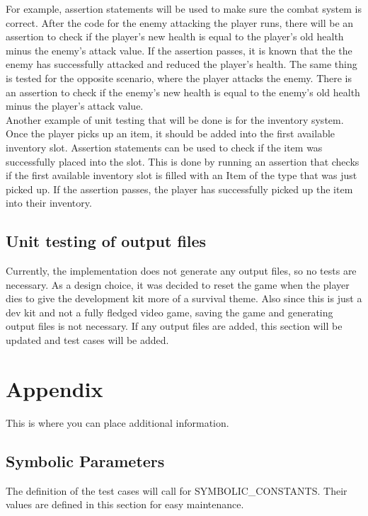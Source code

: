 \documentclass[12pt, titlepage]{article}
\begin{document}
For example, assertion statements will be used to make sure the combat system is correct. After the code for the enemy attacking the player runs, there will be an assertion to check if the player's new health is equal to the player's old health minus the enemy's attack value. If the assertion passes, it is known that the the enemy has successfully attacked and reduced the player's health. The same thing is tested for the opposite scenario, where the player attacks the enemy. There is an assertion to check if the enemy's new health is equal to the enemy's old health minus the player's attack value. \\

Another example of unit testing that will be done is for the inventory system. Once the player picks up an item, it should be added into the first available inventory slot. Assertion statements can be used to check if the item was successfully placed into the slot. This is done by running an assertion that checks if the first available inventory slot is filled with an Item of the type that was just picked up. If the assertion passes, the player has successfully picked up the item into their inventory.

\subsection{Unit testing of output files}		

Currently, the implementation does not generate any output files, so no tests are necessary. As a design choice, it was decided to reset the game when the player dies to give the development kit more of a survival theme. Also since this is just a dev kit and not a fully fledged video game, saving the game and generating output files is not necessary. If any output files are added, this section will be updated and test cases will be added.

%
%
%
%
%
\section{Appendix}

This is where you can place additional information.

\subsection{Symbolic Parameters}

The definition of the test cases will call for SYMBOLIC\_CONSTANTS.
Their values are defined in this section for easy maintenance.
\end{document}
